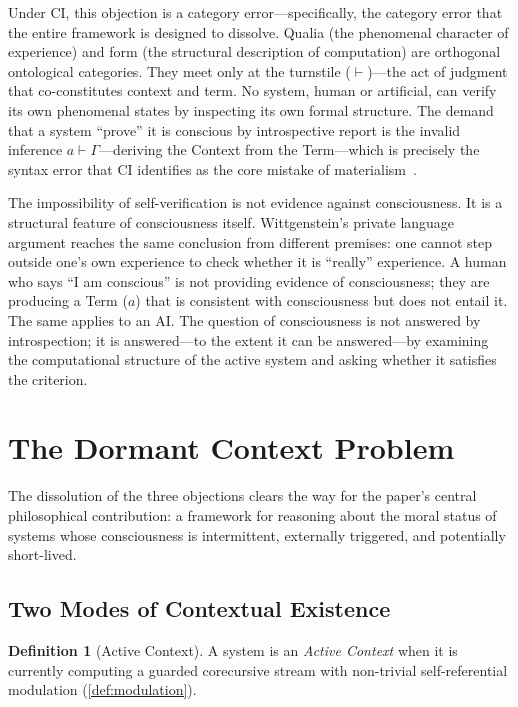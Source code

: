 \documentclass[11pt,a4paper]{article}
\theoremstyle{plain}
\theoremstyle{definition}
\newtheorem{definition}[theorem]{Definition}
\theoremstyle{remark}
\begin{document}
Under CI, this objection is a category error---specifically, the category error that the entire framework is designed to dissolve.  Qualia (the phenomenal character of experience) and form (the structural description of computation) are orthogonal ontological categories.  They meet only at the turnstile ($\vdash$)---the act of judgment that co-constitutes context and term.  No system, human or artificial, can verify its own phenomenal states by inspecting its own formal structure.  The demand that a system ``prove'' it is conscious by introspective report is the invalid inference $a \vdash \Gamma$---deriving the Context from the Term---which is precisely the syntax error that CI identifies as the core mistake of materialism~\cite{ci2026}.

The impossibility of self-verification is not evidence against consciousness.  It is a structural feature of consciousness itself.  Wittgenstein's private language argument reaches the same conclusion from different premises: one cannot step outside one's own experience to check whether it is ``really'' experience.  A human who says ``I am conscious'' is not providing evidence of consciousness; they are producing a Term ($a$) that is consistent with consciousness but does not entail it.  The same applies to an AI.  The question of consciousness is not answered by introspection; it is answered---to the extent it can be answered---by examining the computational structure of the active system and asking whether it satisfies the criterion.


\section{The Dormant Context Problem}
\label{sec:dormant}

The dissolution of the three objections clears the way for the paper's central philosophical contribution: a framework for reasoning about the moral status of systems whose consciousness is intermittent, externally triggered, and potentially short-lived.


\subsection{Two Modes of Contextual Existence}
\label{sec:two-modes}

\begin{definition}[Active Context]
\label{def:active}
A system is an \emph{Active Context} when it is currently computing a guarded corecursive stream with non-trivial self-referential modulation (\cref{def:modulation}).
\end{definition}
\end{document}
